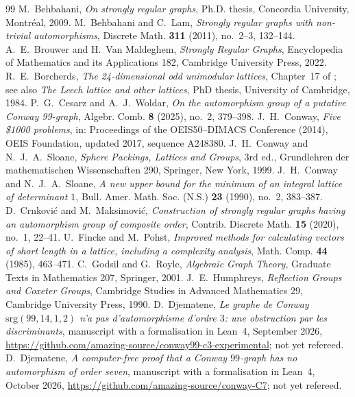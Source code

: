 \documentclass[11pt]{amsart}
\theoremstyle{definition}
\theoremstyle{remark}
\begin{document}
\begin{thebibliography}{99}
 M.~Behbahani, \emph{On strongly regular graphs}, Ph.D. thesis, Concordia University, Montr\'eal, 2009.
 M.~Behbahani and C.~Lam, \emph{Strongly regular graphs with non-trivial automorphisms}, Discrete Math.
\textbf{311} (2011), no.~2--3, 132--144.
 A.~E.~Brouwer and H.~Van Maldeghem, \emph{Strongly Regular Graphs}, Encyclopedia of Mathematics and its
Applications 182, Cambridge University Press, 2022.
 R.~E.~Borcherds, \emph{The 24-dimensional odd unimodular lattices}, Chapter~17 of \cite{SPLAG}; see also
\emph{The Leech lattice and other lattices}, PhD thesis, University of Cambridge, 1984.
 P.~G.~Cesarz and A.~J.~Woldar, \emph{On the automorphism group of a putative Conway 99-graph}, Algebr. Comb.
\textbf{8} (2025), no.~2, 379--398.
 J.~H.~Conway, \emph{Five \$1000 problems}, in: Proceedings of the OEIS50--DIMACS Conference (2014), OEIS
Foundation, updated 2017, sequence A248380.
 J.~H.~Conway and N.~J.~A.~Sloane, \emph{Sphere Packings, Lattices and Groups}, 3rd ed., Grundlehren der
mathematischen Wissenschaften 290, Springer, New York, 1999.
 J.~H.~Conway and N.~J.~A.~Sloane, \emph{A new upper bound for the minimum of an integral lattice of
determinant $1$}, Bull. Amer. Math. Soc. (N.S.) \textbf{23} (1990), no.~2, 383--387.
 D.~Crnkovi\'c and M.~Maksimovi\'c, \emph{Construction of strongly regular graphs having an automorphism group of
composite order}, Contrib. Discrete Math. \textbf{15} (2020), no.~1, 22--41.
 U.~Fincke and M.~Pohst, \emph{Improved methods for calculating vectors of short length in a lattice,
including a complexity analysis}, Math. Comp. \textbf{44} (1985), 463--471.
 C.~Godsil and G.~Royle, \emph{Algebraic Graph Theory}, Graduate Texts in Mathematics 207, Springer, 2001.
 J.~E.~Humphreys, \emph{Reflection Groups and Coxeter Groups}, Cambridge Studies in Advanced Mathematics 29,
Cambridge University Press, 1990.
 D.~Djematene, \emph{Le graphe de Conway $\mathrm{srg}(99,14,1,2)$ n'a pas
d'automorphisme d'ordre $3$: une obstruction par les discriminants}, manuscript with a formalisation in Lean~4, September
2026, \url{https://github.com/amazing-source/conway99-c3-experimental}; not yet refereed.
 D.~Djematene, \emph{A computer-free proof that a Conway $99$-graph has no
automorphism of order seven}, manuscript with a formalisation in Lean~4, October 2026,
\url{https://github.com/amazing-source/conway-C7}; not yet refereed.

\end{thebibliography}
\end{document}
